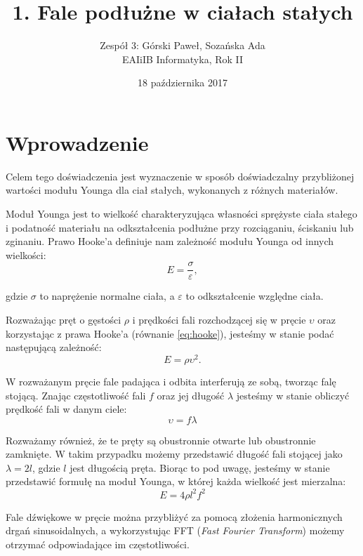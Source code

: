 \documentclass[12pt,a4paper]{article}
\title{1. Fale podłużne w ciałach stałych}
\date{18 października 2017}
\author{
	Zespół 3: Górski Paweł, Sozańska Ada\\
	EAIiIB Informatyka, Rok II
}
\begin{document}
\maketitle
\section{Wprowadzenie}
Celem tego doświadczenia jest wyznaczenie w sposób doświadczalny przybliżonej wartości modułu Younga dla ciał stałych, wykonanych z różnych materiałów. 

Moduł Younga jest to wielkość charakteryzująca własności sprężyste ciała stałego i podatność materiału na odkształcenia podłużne przy rozciąganiu, ściskaniu lub zginaniu. Prawo Hooke'a definiuje nam zależność modułu Younga od innych wielkości:
\begin{equation}
	E = \frac{\sigma}{\varepsilon},
	\label{eq:hooke}
\end{equation}

gdzie $\sigma$ to naprężenie normalne ciała, a $\varepsilon$ to odkształcenie względne ciała.

Rozważając pręt o gęstości $\rho$ i prędkości fali rozchodzącej się w pręcie $\upsilon$ oraz korzystając z prawa Hooke'a (równanie \ref{eq:hooke}), jesteśmy w stanie podać następującą zależność:
\begin{equation}
	E = \rho \upsilon^2.
\end{equation}

W rozważanym pręcie fale padająca i odbita interferują ze sobą, tworząc falę stojącą. Znając częstotliwość fali $f$ oraz jej długość $\lambda$ jesteśmy w stanie obliczyć prędkość fali w danym ciele:
\begin{equation}
	\upsilon = f\lambda
\end{equation}

Rozważamy również, że te pręty są obustronnie otwarte lub obustronnie zamknięte. W takim przypadku możemy przedstawić długość fali stojącej jako $\lambda = 2l$, gdzie $l$ jest długością pręta. Biorąc to pod uwagę, jesteśmy w stanie przedstawić formułę na moduł Younga, w której każda wielkość jest mierzalna:
\begin{equation}
	E = 4\rho l^2 f^2
\end{equation}

Fale dźwiękowe w pręcie można przybliżyć za pomocą złożenia harmonicznych drgań sinusoidalnych, a wykorzystując FFT (\emph{Fast Fourier Transform}) możemy otrzymać odpowiadające im częstotliwości. 
\end{document}
